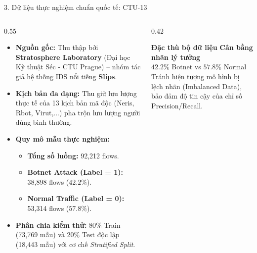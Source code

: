 \documentclass[lualatex,10pt,unknownkeysallowed]{beamer}
\begin{document}
\begin{frame}{3. Dữ liệu thực nghiệm chuẩn quốc tế: CTU-13}
  \begin{columns}[c]
    \begin{column}{0.55\textwidth}
      \begin{itemize}
        \item \textbf{Nguồn gốc:} Thu thập bởi \textbf{Stratosphere Laboratory} (Đại học Kỹ thuật Séc - CTU Prague) – nhóm tác giả hệ thống IDS nổi tiếng \textbf{Slips}.
        \item \textbf{Kịch bản đa dạng:} Thu giữ lưu lượng thực tế của 13 kịch bản mã độc (Neris, Rbot, Virut,...) pha trộn lưu lượng người dùng bình thường.
        \item \textbf{Quy mô mẫu thực nghiệm:}
        \begin{itemize}
          \item \textbf{Tổng số luồng:} 92,212 flows.
          \item \textbf{Botnet Attack (Label = 1):} 38,898 flows ($42.2\%$).
          \item \textbf{Normal Traffic (Label = 0):} 53,314 flows ($57.8\%$).
        \end{itemize}
        \item \textbf{Phân chia kiểm thử:} 80\% Train (73,769 mẫu) và 20\% Test độc lập (18,443 mẫu) với cơ chế \textit{Stratified Split}.
      \end{itemize}
    \end{column}
    \begin{column}{0.42\textwidth}
      \begin{block}{\textbf{Đặc thù bộ dữ liệu}}
        \centering
        \textbf{Cân bằng nhãn lý tưởng}\\
        $42.2\%$ Botnet vs $57.8\%$ Normal\\
        \vspace{0.3cm}
        Tránh hiện tượng mô hình bị lệch nhãn (Imbalanced Data), bảo đảm độ tin cậy của chỉ số Precision/Recall.
      \end{block}
    \end{column}
  \end{columns}
\end{frame}
\end{document}
